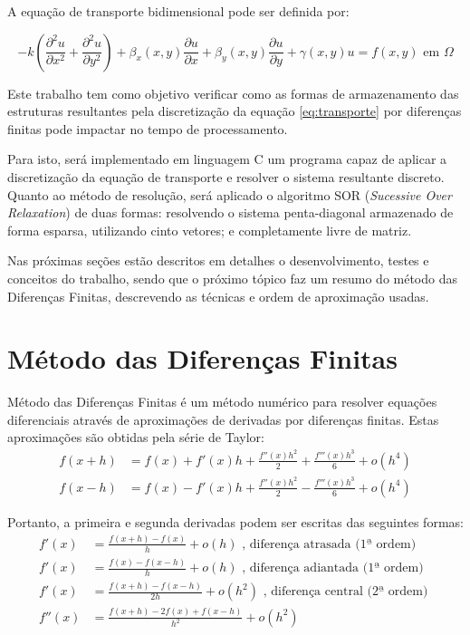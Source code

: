 \documentclass[
	11pt,				%
	oneside,			%
	a4paper,			%
	english,			%
	brazil,				%
	]{article}
\begin{document}
A equação de transporte bidimensional pode ser definida por:

\begin{equation} \label{eq:transporte}
- k \left(\frac{\partial^2 u}{\partial x^2} + \frac{\partial^2 u}{\partial 
y^2}\right) +
\beta_x(x,y)\frac{\partial u}{\partial x} +
\beta_y(x,y)\frac{\partial u}{\partial y} +
\gamma(x,y)u = f(x,y) \text{ em } \Omega
\end{equation}

Este trabalho tem como objetivo verificar como as formas de armazenamento das 
estruturas resultantes pela discretização da equação \eqref{eq:transporte} por 
diferenças finitas pode impactar no tempo de processamento.

Para isto, será implementado em linguagem C um programa capaz de aplicar a 
discretização da equação de transporte e resolver o sistema resultante 
discreto. Quanto ao método de resolução, será aplicado o algoritmo SOR
(\textit{Sucessive Over Relaxation}) de duas formas: resolvendo o sistema 
penta-diagonal armazenado de forma esparsa, utilizando  cinto vetores; e 
completamente livre de matriz.

Nas próximas seções estão descritos em detalhes o desenvolvimento, testes e 
conceitos do trabalho, sendo que o próximo tópico faz um resumo do método das 
Diferenças Finitas, descrevendo as técnicas e ordem de aproximação usadas.

\section{Método das Diferenças Finitas}
Método das Diferenças Finitas é um método numérico para resolver equações 
diferenciais através de aproximações de derivadas por diferenças finitas. Estas 
aproximações são obtidas pela série de Taylor:
\begin{align*}
f(x+h) &= f(x)+f'(x)h + \frac{f''(x)h^2}{2} + \frac{f'''(x)h^3}{6} + o(h^4) \\ 
f(x-h) &= f(x) - f'(x)h + \frac{f''(x)h^2}{2} - \frac{f'''(x)h^3}{6} + 
o(h^4)
\end{align*}

Portanto, a primeira e segunda derivadas podem ser escritas das
seguintes formas:
\begin{align*}
f'(x) &= \frac{f(x+h)-f(x)}{h}+o(h) \text{ , diferença atrasada
(1ª ordem) }  \\
f'(x) &= \frac{f(x) - f(x-h)}{h} + o(h) \text{ , diferença adiantada
(1ª ordem) } \\
f'(x) &= \frac{f(x+h) - f(x-h)}{2h} + o(h^2) \text{ , diferença central 
(2ª ordem) } \\
f''(x) &= \frac{f(x+h) -2f(x) + f(x-h)}{h^2} + o(h^2)
\end{align*}
\end{document}
